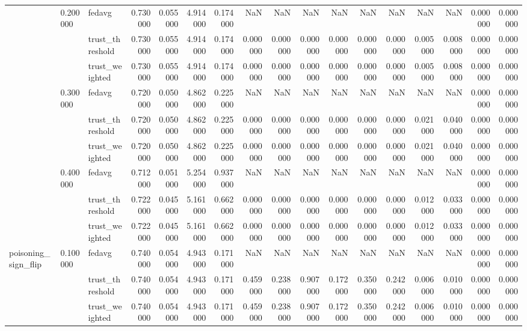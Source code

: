 \begin{tabular}{lllrrrrrrrrrrrrrr}
\cline{2-17}
 & \multirow[t]{3}{*}{0.200000} & fedavg & 0.730000 & 0.055000 & 4.914000 & 0.174000 & NaN & NaN & NaN & NaN & NaN & NaN & NaN & NaN & 0.000000 & 0.000000 \\
 &  & trust_threshold & 0.730000 & 0.055000 & 4.914000 & 0.174000 & 0.000000 & 0.000000 & 0.000000 & 0.000000 & 0.000000 & 0.000000 & 0.005000 & 0.008000 & 0.000000 & 0.000000 \\
 &  & trust_weighted & 0.730000 & 0.055000 & 4.914000 & 0.174000 & 0.000000 & 0.000000 & 0.000000 & 0.000000 & 0.000000 & 0.000000 & 0.005000 & 0.008000 & 0.000000 & 0.000000 \\
\cline{2-17}
 & \multirow[t]{3}{*}{0.300000} & fedavg & 0.720000 & 0.050000 & 4.862000 & 0.225000 & NaN & NaN & NaN & NaN & NaN & NaN & NaN & NaN & 0.000000 & 0.000000 \\
 &  & trust_threshold & 0.720000 & 0.050000 & 4.862000 & 0.225000 & 0.000000 & 0.000000 & 0.000000 & 0.000000 & 0.000000 & 0.000000 & 0.021000 & 0.040000 & 0.000000 & 0.000000 \\
 &  & trust_weighted & 0.720000 & 0.050000 & 4.862000 & 0.225000 & 0.000000 & 0.000000 & 0.000000 & 0.000000 & 0.000000 & 0.000000 & 0.021000 & 0.040000 & 0.000000 & 0.000000 \\
\cline{2-17}
 & \multirow[t]{3}{*}{0.400000} & fedavg & 0.712000 & 0.051000 & 5.254000 & 0.937000 & NaN & NaN & NaN & NaN & NaN & NaN & NaN & NaN & 0.000000 & 0.000000 \\
 &  & trust_threshold & 0.722000 & 0.045000 & 5.161000 & 0.662000 & 0.000000 & 0.000000 & 0.000000 & 0.000000 & 0.000000 & 0.000000 & 0.012000 & 0.033000 & 0.000000 & 0.000000 \\
 &  & trust_weighted & 0.722000 & 0.045000 & 5.161000 & 0.662000 & 0.000000 & 0.000000 & 0.000000 & 0.000000 & 0.000000 & 0.000000 & 0.012000 & 0.033000 & 0.000000 & 0.000000 \\
\cline{1-17} \cline{2-17}
\multirow[t]{12}{*}{poisoning_sign_flip} & \multirow[t]{3}{*}{0.100000} & fedavg & 0.740000 & 0.054000 & 4.943000 & 0.171000 & NaN & NaN & NaN & NaN & NaN & NaN & NaN & NaN & 0.000000 & 0.000000 \\
 &  & trust_threshold & 0.740000 & 0.054000 & 4.943000 & 0.171000 & 0.459000 & 0.238000 & 0.907000 & 0.172000 & 0.350000 & 0.242000 & 0.006000 & 0.010000 & 0.000000 & 0.000000 \\
 &  & trust_weighted & 0.740000 & 0.054000 & 4.943000 & 0.171000 & 0.459000 & 0.238000 & 0.907000 & 0.172000 & 0.350000 & 0.242000 & 0.006000 & 0.010000 & 0.000000 & 0.000000 \\

\end{tabular}
